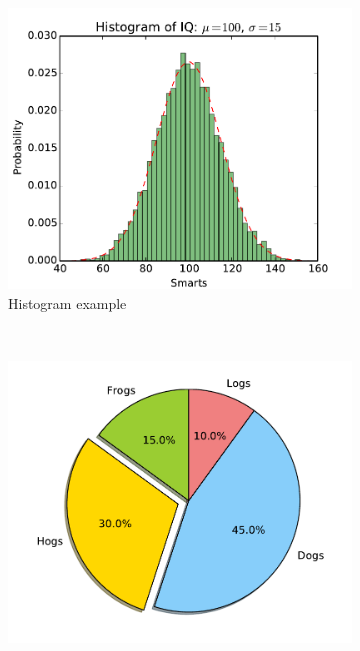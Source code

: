 \documentclass[pdftex,10pt,a4paper]{report}
\begin{document}
\begin{figure}
        \centering
        \begin{subfigure}[b]{0.3\textwidth}
                \includegraphics[width=\textwidth]{img/examples/histogram}
                \caption{Histogram example}
                \label{fig:histogram}
        \end{subfigure}%
        ~ %
        \begin{subfigure}[b]{0.3\textwidth}
                \includegraphics[width=\textwidth]{img/examples/pie}

\end{subfigure}
\end{figure}
\end{document}
